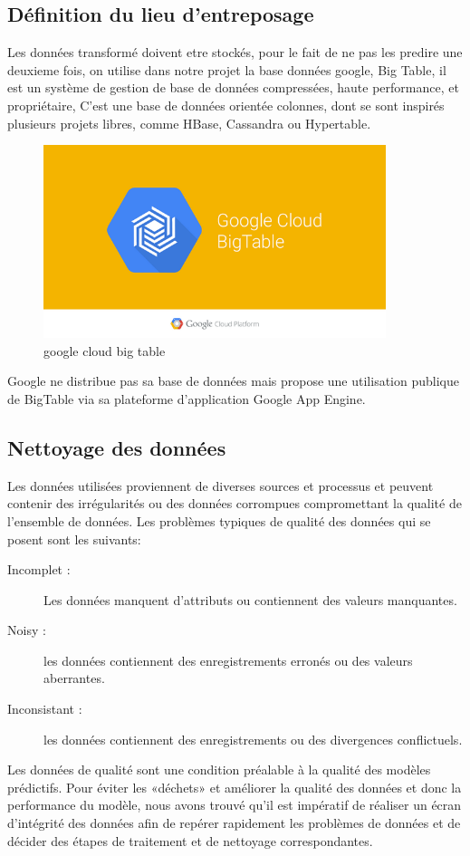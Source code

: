 \subsection{Définition du lieu d'entreposage}
Les données transformé doivent etre stockés, pour le fait de ne pas les predire une deuxieme fois, on utilise dans notre projet la base données google, Big Table, il  est un système de gestion de base de données compressées, haute performance, et propriétaire, C'est une base de données orientée colonnes, dont se sont inspirés plusieurs projets libres, comme HBase, Cassandra ou Hypertable.\\
\begin{figure}[H]
	\begin{center}
	\includegraphics[width=100mm,scale=0.5]{Images/google-cloud-bigtable.png}
	\end{center}
	\caption{google cloud big table}
	\label{fig:gglcloudbigtable}
\end{figure}	
 Google ne distribue pas sa base de données mais propose une utilisation publique de BigTable via sa plateforme d'application Google App Engine.
\subsection{Nettoyage des données}
Les données utilisées proviennent de diverses sources et processus et peuvent contenir des irrégularités ou des données corrompues compromettant la qualité de l'ensemble de données. Les problèmes typiques de qualité des données qui se posent sont les suivants:
\begin{description}
\item[Incomplet : ] Les données manquent d'attributs ou contiennent des valeurs manquantes.
\item[Noisy : ]les données contiennent des enregistrements erronés ou des valeurs aberrantes.
\item[Inconsistant : ]les données contiennent des enregistrements ou des divergences conflictuels.
\end{description}
Les données de qualité sont une condition préalable à la qualité des modèles prédictifs. Pour éviter les «déchets» et améliorer la qualité des données et donc la performance du modèle, nous avons trouvé qu'il est impératif de réaliser un écran d'intégrité des données afin de repérer rapidement les problèmes de données et de décider des étapes de traitement et de nettoyage correspondantes.
